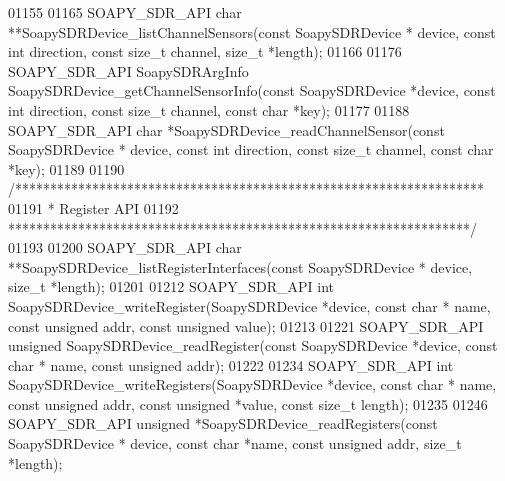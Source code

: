 \begin{DoxyCode}
01155 
01165 SOAPY_SDR_API \textcolor{keywordtype}{char} **SoapySDRDevice_listChannelSensors(\textcolor{keyword}{const} SoapySDRDevice *
      device, \textcolor{keyword}{const} \textcolor{keywordtype}{int} direction, \textcolor{keyword}{const} \textcolor{keywordtype}{size\_t} channel, \textcolor{keywordtype}{size\_t} *length);
01166 
01176 SOAPY_SDR_API SoapySDRArgInfo SoapySDRDevice_getChannelSensorInfo(\textcolor{keyword}{const} 
      SoapySDRDevice *device, \textcolor{keyword}{const} \textcolor{keywordtype}{int} direction, \textcolor{keyword}{const} \textcolor{keywordtype}{size\_t} channel, \textcolor{keyword}{const} \textcolor{keywordtype}{char} *key);
01177 
01188 SOAPY_SDR_API \textcolor{keywordtype}{char} *SoapySDRDevice_readChannelSensor(\textcolor{keyword}{const} SoapySDRDevice *
      device, \textcolor{keyword}{const} \textcolor{keywordtype}{int} direction, \textcolor{keyword}{const} \textcolor{keywordtype}{size\_t} channel, \textcolor{keyword}{const} \textcolor{keywordtype}{char} *key);
01189 
01190 \textcolor{comment}{/*******************************************************************}
01191 \textcolor{comment}{ * Register API}
01192 \textcolor{comment}{ ******************************************************************/}
01193 
01200 SOAPY_SDR_API \textcolor{keywordtype}{char} **SoapySDRDevice_listRegisterInterfaces(\textcolor{keyword}{const} SoapySDRDevice *
      device, \textcolor{keywordtype}{size\_t} *length);
01201 
01212 SOAPY_SDR_API \textcolor{keywordtype}{int} SoapySDRDevice_writeRegister(SoapySDRDevice *device, \textcolor{keyword}{const} \textcolor{keywordtype}{char} *
      name, \textcolor{keyword}{const} \textcolor{keywordtype}{unsigned} addr, \textcolor{keyword}{const} \textcolor{keywordtype}{unsigned} value);
01213 
01221 SOAPY_SDR_API \textcolor{keywordtype}{unsigned} SoapySDRDevice_readRegister(\textcolor{keyword}{const} SoapySDRDevice *device, \textcolor{keyword}{const} \textcolor{keywordtype}{char} *
      name, \textcolor{keyword}{const} \textcolor{keywordtype}{unsigned} addr);
01222 
01234 SOAPY_SDR_API \textcolor{keywordtype}{int} SoapySDRDevice_writeRegisters(SoapySDRDevice *device, \textcolor{keyword}{const} \textcolor{keywordtype}{char} *
      name, \textcolor{keyword}{const} \textcolor{keywordtype}{unsigned} addr, \textcolor{keyword}{const} \textcolor{keywordtype}{unsigned} *value, \textcolor{keyword}{const} \textcolor{keywordtype}{size\_t} length);
01235 
01246 SOAPY_SDR_API \textcolor{keywordtype}{unsigned} *SoapySDRDevice_readRegisters(\textcolor{keyword}{const} SoapySDRDevice *
      device, \textcolor{keyword}{const} \textcolor{keywordtype}{char} *name, \textcolor{keyword}{const} \textcolor{keywordtype}{unsigned} addr, \textcolor{keywordtype}{size\_t} *length);

\end{DoxyCode}
